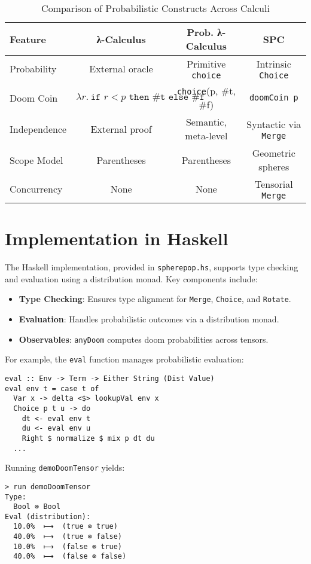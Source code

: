 \documentclass{article}
\begin{document}
\begin{table}[h]
\centering
\begin{tabular}{|l|c|c|c|}
\hline
\textbf{Feature} & \textbf{λ-Calculus} & \textbf{Prob. λ-Calculus} & \textbf{SPC} \\
\hline
Probability & External oracle & Primitive \texttt{choice} & Intrinsic \texttt{Choice} \\
Doom Coin & $\lambda r.\ \texttt{if } r<p \texttt{ then \#t else \#f}$ & \texttt{choice}(p, \#t, \#f) & \texttt{doomCoin p} \\
Independence & External proof & Semantic, meta-level & Syntactic via \texttt{Merge} \\
Scope Model & Parentheses & Parentheses & Geometric spheres \\
Concurrency & None & None & Tensorial \texttt{Merge} \\
\hline
\end{tabular}
\caption{Comparison of Probabilistic Constructs Across Calculi}
\end{table}

\section{Implementation in Haskell}
The Haskell implementation, provided in \texttt{spherepop.hs}, supports type checking and evaluation using a distribution monad. Key components include:

\begin{itemize}
    \item \textbf{Type Checking}: Ensures type alignment for \texttt{Merge}, \texttt{Choice}, and \texttt{Rotate}.
    \item \textbf{Evaluation}: Handles probabilistic outcomes via a distribution monad.
    \item \textbf{Observables}: \texttt{anyDoom} computes doom probabilities across tensors.
\end{itemize}

For example, the \texttt{eval} function manages probabilistic evaluation:
\lstset{language=Haskell, basicstyle=\small\ttfamily, breaklines=true}
\begin{lstlisting}
eval :: Env -> Term -> Either String (Dist Value)
eval env t = case t of
  Var x -> delta <$> lookupVal env x
  Choice p t u -> do
    dt <- eval env t
    du <- eval env u
    Right $ normalize $ mix p dt du
  ...
\end{lstlisting}

Running \texttt{demoDoomTensor} yields:
\begin{verbatim}
> run demoDoomTensor
Type:
  Bool ⊗ Bool
Eval (distribution):
  10.0%  ⟼  (true ⊗ true)
  40.0%  ⟼  (true ⊗ false)
  10.0%  ⟼  (false ⊗ true)
  40.0%  ⟼  (false ⊗ false)
\end{verbatim}
\end{document}

